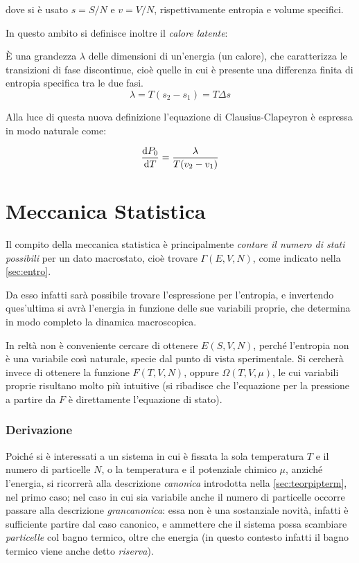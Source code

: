 \noindent dove si è usato $s = S/N$ e $v = V/N$, rispettivamente entropia e volume specifici.

In questo ambito si definisce inoltre il \textit{calore latente}:

\begin{defn}
	\`E una grandezza $\lambda$ delle dimensioni di un'energia (un calore), che caratterizza le transizioni di fase discontinue, cioè quelle in cui è presente una differenza finita di entropia specifica tra le due fasi.
	\begin{equation*}
		\lambda = T(s_2 - s_1) = T \Delta s
	\end{equation*} 
\end{defn}

Alla luce di questa nuova definizione l'equazione di Clausius-Clapeyron è espressa in modo naturale come:

\begin{equation*}
\derivative{ P_0}{T} = \frac{\lambda}{T(v_2 - v_1)}
\end{equation*}

\section{Meccanica Statistica}
\label{sec:statmech}

Il compito della meccanica statistica è principalmente \textit{contare il numero di stati possibili} per un dato macrostato, cioè trovare $\Gamma(E,V,N)$, come indicato nella \cref{sec:entro}.

Da esso infatti sarà possibile trovare l'espressione per l'entropia, e invertendo ques'ultima si avrà l'energia in funzione delle sue variabili proprie, che determina in modo completo la dinamica macroscopica.

In reltà non è conveniente cercare di ottenere $E(S,V,N)$, perché l'entropia non è una variabile così naturale, specie dal punto di vista sperimentale. Si cercherà invece di ottenere la funzione $ F(T,V,N) $, oppure $ \Omega(T,V,\mu) $, le cui variabili proprie risultano molto più intuitive (si ribadisce che l'equazione per la pressione a partire da $ F $ è direttamente l'equazione di stato).

\subsubsection{Derivazione}
Poiché si è interessati a un sistema in cui è fissata la sola temperatura $ T $ e il numero di particelle $ N $, o la temperatura e il potenziale chimico $ \mu $, anziché l'energia, si ricorrerà alla descrizione \textit{canonica} introdotta nella \cref{sec:teorpipterm}, nel primo caso; nel caso in cui sia variabile anche il numero di particelle occorre passare alla descrizione \textit{grancanonica}: essa non è una sostanziale novità, infatti è sufficiente partire dal caso canonico, e ammettere che il sistema possa scambiare \textit{particelle} col bagno termico, oltre che energia (in questo contesto infatti il bagno termico viene anche detto \textit{riserva}).
\newline

